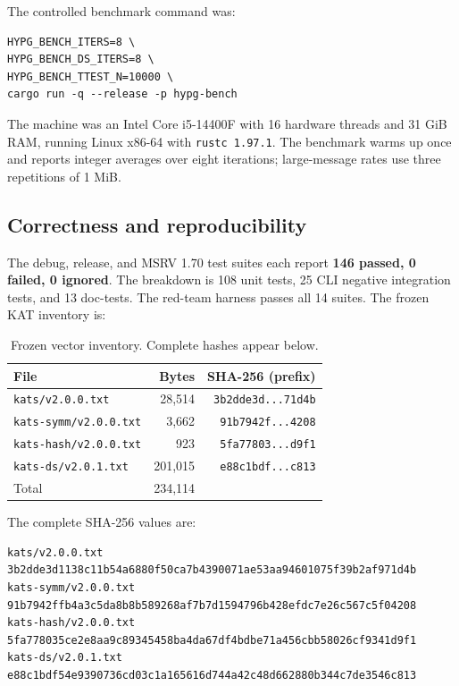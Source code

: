 \documentclass[runningheads]{llncs}
\begin{document}
The controlled benchmark command was:
\begin{verbatim}
HYPG_BENCH_ITERS=8 \
HYPG_BENCH_DS_ITERS=8 \
HYPG_BENCH_TTEST_N=10000 \
cargo run -q --release -p hypg-bench
\end{verbatim}
The machine was an Intel Core i5-14400F with 16 hardware threads and
31 GiB RAM, running Linux x86-64 with \texttt{rustc 1.97.1}.  The
benchmark warms up once and reports integer averages over eight
iterations; large-message rates use three repetitions of 1 MiB.

\subsection{Correctness and reproducibility}

The debug, release, and MSRV 1.70 test suites each report
\textbf{146 passed, 0 failed, 0 ignored}.  The breakdown is 108 unit
tests, 25 CLI negative integration tests, and 13 doc-tests.  The
red-team harness passes all 14 suites.  The frozen KAT inventory is:

\begin{table}[t]
\centering
\small
\begin{tabular}{@{}lrr@{}}
\toprule
File & Bytes & SHA-256 (prefix) \\
\midrule
\texttt{kats/v2.0.0.txt} & 28,514 & \texttt{3b2dde3d...71d4b} \\
\texttt{kats-symm/v2.0.0.txt} & 3,662 & \texttt{91b7942f...4208} \\
\texttt{kats-hash/v2.0.0.txt} & 923 & \texttt{5fa77803...d9f1} \\
\texttt{kats-ds/v2.0.1.txt} & 201,015 & \texttt{e88c1bdf...c813} \\
\midrule
Total & 234,114 & \\
\bottomrule
\end{tabular}
\caption{Frozen vector inventory.  Complete hashes appear below.}
\label{tab:kats}
\end{table}

The complete SHA-256 values are:
\begin{verbatim}
kats/v2.0.0.txt
3b2dde3d1138c11b54a6880f50ca7b4390071ae53aa94601075f39b2af971d4b
kats-symm/v2.0.0.txt
91b7942ffb4a3c5da8b8b589268af7b7d1594796b428efdc7e26c567c5f04208
kats-hash/v2.0.0.txt
5fa778035ce2e8aa9c89345458ba4da67df4bdbe71a456cbb58026cf9341d9f1
kats-ds/v2.0.1.txt
e88c1bdf54e9390736cd03c1a165616d744a42c48d662880b344c7de3546c813
\end{verbatim}
\end{document}
